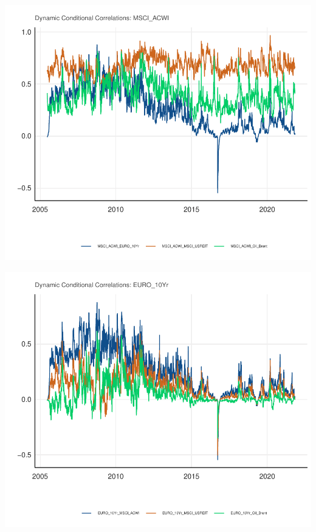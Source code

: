 \documentclass[11pt,preprint, authoryear]{elsarticle}
\numberwithin{equation}{section}
\numberwithin{figure}{section}
\numberwithin{table}{section}
\begin{document}
\includegraphics{Question6_files/figure-latex/unnamed-chunk-14-1.pdf}

\includegraphics{Question6_files/figure-latex/unnamed-chunk-15-1.pdf}
\end{document}
